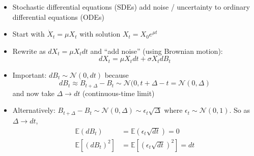 \documentclass[10pt]{beamer}
\begin{document}
\begin{frame}{}

{\small
\begin{itemize}
\item Stochastic differential equations (SDEs) add noise / uncertainty to ordinary differential equations (ODEs)

\item Start with $\dot X_t = \mu X_t$ with solution $X_t = X_0 e^{\mu t}$

\item Rewrite as $d X_t = \mu X_t dt$ and ``add noise'' (using Brownian motion):
\begin{equation*}
	dX_t = \mu X_t dt + \sigma X_t dB_t
\end{equation*}

\item Important: $dB_t \sim \mathcal N(0, dt)$ because 
\begin{equation*}
	dB_t \approx B_{t + \Delta} - B_t \sim \mathcal N(0, t +\Delta - t = \mathcal N(0, \Delta)
\end{equation*}
and now take $\Delta \to dt$ (continuous-time limit)

\item Alternatively: $B_{t + \Delta} - B_t \sim \mathcal N(0, \Delta) \sim \epsilon_t \sqrt{\Delta}$ where $\epsilon_t \sim \mathcal N(0, 1)$. So as $\Delta \to dt$,
\begin{align*}
	\mathbb E(dB_t) &= \mathbb E(\epsilon_t \sqrt{dt}) = 0 \\
	\mathbb E[(dB_t)^2] &= \mathbb E[(\epsilon_t \sqrt{dt})^2] = dt
\end{align*}
\end{itemize}
}
\end{frame}
\end{document}
